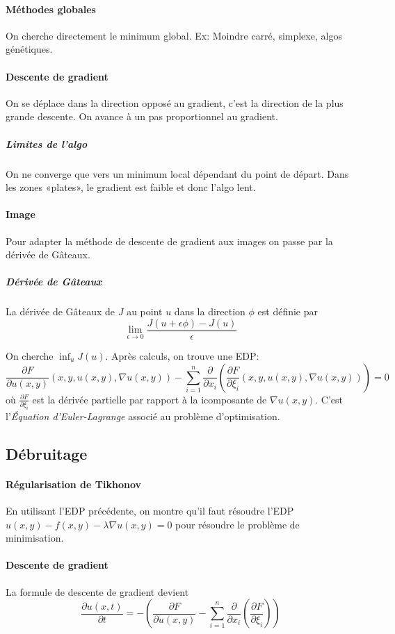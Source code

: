 \documentclass[french]{article}
\begin{document}
\paragraph{Méthodes globales} On cherche directement le minimum global.
Ex: Moindre carré, simplexe, algos génétiques.

\paragraph{Descente de gradient} On se déplace dans la direction opposé au
gradient, c'est la direction de la plus grande descente. On avance à un
pas proportionnel au gradient.

\subparagraph{Limites de l'algo} On ne converge que vers un minimum local
dépendant du point de départ. Dans les zones «plates», le gradient est
faible et donc l'algo lent.

\paragraph{Image} Pour adapter la méthode de descente de gradient aux
images on passe par la dérivée de Gâteaux.

\subparagraph{Dérivée de Gâteaux} La dérivée de Gâteaux de $J$ au point
$u$ dans la direction $\phi$ est définie par
$$\lim_{\epsilon \to 0} \frac{J(u + \epsilon \phi) - J(u)}{\epsilon}$$

On cherche $\inf_u J(u)$. Après calculs, on trouve une EDP:
$$\frac{\partial F}{\partial u(x,y)}(x, y, u(x,y),\nabla u(x,y))
- \sum_{i=1}^n \frac{\partial}{\partial x_i}
(\frac{\partial F}{\partial \xi_i}(x, y, u(x,y),\nabla u(x,y))) = 0$$
où $\frac{\partial F}{\partial \xi_i}$ est la dérivée partielle par
rapport à la i\ieme composante de $\nabla u (x,y)$.
C'est l'\emph{Équation d'Euler-Lagrange} associé au problème d'optimisation.

\subsection{Débruitage}
\paragraph{Régularisation de Tikhonov} En utilisant l'EDP précédente,
on montre qu'il faut résoudre l'EDP $u(x,y) -f(x,y) -\lambda \nabla u(x,y) = 0$
pour résoudre le problème de minimisation.

\paragraph{Descente de gradient} La formule de descente de gradient devient
$$\frac{\partial u(x,t)}{\partial t} = -\left(\frac{\partial F}{\partial u(x,y)}
- \sum_{i=1}^n \frac{\partial}{\partial x_i} (\frac{\partial F}{\partial \xi_i})\right)$$
\end{document}
